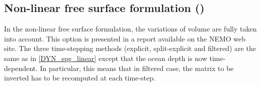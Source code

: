 \documentclass[../main/NEMO_manual]{subfiles}
\begin{document}
\subsection{Non-linear free surface formulation (\protect{})}
\label{subsec:DYN_spg_vvl}

In the non-linear free surface formulation, the variations of volume are fully taken into account.
This option is presented in a report \citep{Levier2007} available on the NEMO web site.
The three time-stepping methods (explicit, split-explicit and filtered) are the same as in
\autoref{DYN_spg_linear} except that the ocean depth is now time-dependent.
In particular, this means that in filtered case, the matrix to be inverted has to be recomputed at each time-step.

\biblio
\end{document}
